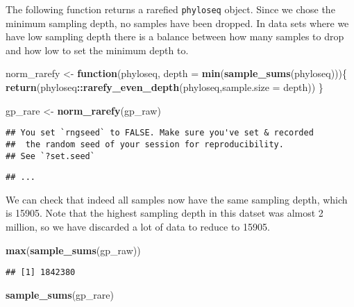 \documentclass[
]{book}
\newenvironment{Shaded}{\begin{snugshade}}{\end{snugshade}}
\newcommand{\ControlFlowTok}[1]{\textcolor[rgb]{0.13,0.29,0.53}{\textbf{#1}}}
\newcommand{\DataTypeTok}[1]{\textcolor[rgb]{0.13,0.29,0.53}{#1}}
\newcommand{\KeywordTok}[1]{\textcolor[rgb]{0.13,0.29,0.53}{\textbf{#1}}}
\newcommand{\NormalTok}[1]{#1}
\newcommand{\OperatorTok}[1]{\textcolor[rgb]{0.81,0.36,0.00}{\textbf{#1}}}
\newcommand{\StringTok}[1]{\textcolor[rgb]{0.31,0.60,0.02}{#1}}
\begin{document}
The following function returns a rarefied \texttt{phyloseq} object. Since we chose the minimum sampling depth, no samples have been dropped. In data sets where we have low sampling depth there is a balance between how many samples to drop and how low to set the minimum depth to.

\begin{Shaded}
\begin{Highlighting}[]
\NormalTok{norm\_rarefy \textless{}{-}}\StringTok{ }\ControlFlowTok{function}\NormalTok{(phyloseq, }\DataTypeTok{depth =} \KeywordTok{min}\NormalTok{(}\KeywordTok{sample\_sums}\NormalTok{(phyloseq)))\{}
    \KeywordTok{return}\NormalTok{(phyloseq}\OperatorTok{::}\KeywordTok{rarefy\_even\_depth}\NormalTok{(phyloseq,}\DataTypeTok{sample.size =}\NormalTok{ depth))}
\NormalTok{\}}
    
\NormalTok{gp\_rare \textless{}{-}}\StringTok{ }\KeywordTok{norm\_rarefy}\NormalTok{(gp\_raw)}
\end{Highlighting}
\end{Shaded}

\begin{verbatim}
## You set `rngseed` to FALSE. Make sure you've set & recorded
##  the random seed of your session for reproducibility.
## See `?set.seed`
\end{verbatim}

\begin{verbatim}
## ...
\end{verbatim}

We can check that indeed all samples now have the same sampling depth, which is 15905. Note that the highest sampling depth in this datset was almost 2 million, so we have discarded a lot of data to reduce to 15905.

\begin{Shaded}
\begin{Highlighting}[]
\KeywordTok{max}\NormalTok{(}\KeywordTok{sample\_sums}\NormalTok{(gp\_raw))}
\end{Highlighting}
\end{Shaded}

\begin{verbatim}
## [1] 1842380
\end{verbatim}

\begin{Shaded}
\begin{Highlighting}[]
\KeywordTok{sample\_sums}\NormalTok{(gp\_rare)}
\end{Highlighting}
\end{Shaded}
\end{document}
